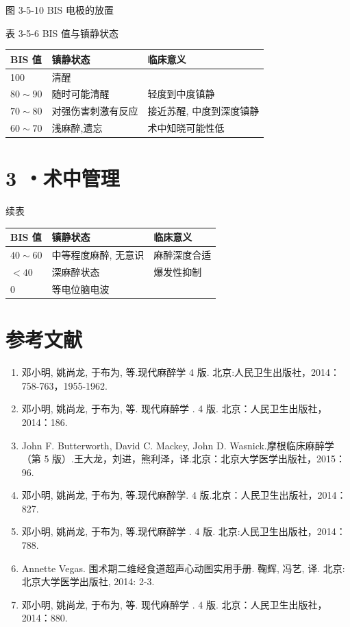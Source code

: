 \documentclass[10pt]{article}
\begin{document}
图 3-5-10 BIS 电极的放置

表 3-5-6 BIS 值与镇静状态

\begin{center}
\begin{tabular}{lll}
\hline
BIS 值 & 镇静状态 & 临床意义 \\
\hline
100 & 清醒 &  \\
$80 \sim 90$ & 随时可能清醒 & 轻度到中度镇静 \\
$70 \sim 80$ & 对强伤害刺激有反应 & 接近苏醒, 中度到深度镇静 \\
$60 \sim 70$ & 浅麻醉,遗忘 & 术中知晓可能性低 \\
\hline
\end{tabular}
\end{center}

\section*{3 ・术中管理}
续表

\begin{center}
\begin{tabular}{lll}
\hline
BIS 值 & 镇静状态 & 临床意义 \\
\hline
$40 \sim 60$ & 中等程度麻醉, 无意识 & 麻醉深度合适 \\
$<40$ & 深麻醉状态 & 爆发性抑制 \\
0 & 等电位脑电波 &  \\
\hline
\end{tabular}
\end{center}

\section*{参考文献}
\begin{enumerate}
  \item 邓小明, 姚尚龙, 于布为, 等.现代麻醉学 4 版. 北京:人民卫生出版社，2014：758-763，1955-1962.

  \item 邓小明, 姚尚龙, 于布为, 等. 现代麻醉学 . 4 版. 北京：人民卫生出版社，2014：186.

  \item John F. Butterworth, David C. Mackey, John D. Wasnick.摩根临床麻醉学（第 5 版）.王大龙，刘进，熊利泽，译.北京：北京大学医学出版社，2015：96.

  \item 邓小明, 姚尚龙, 于布为, 等.现代麻醉学. 4 版.北京：人民卫生出版社，2014：827.

  \item 邓小明, 姚尚龙, 于布为, 等.现代麻醉学 . 4 版. 北京:人民卫生出版社，2014：788.

  \item Annette Vegas. 围术期二维经食道超声心动图实用手册. 鞠辉, 冯艺, 译. 北京: 北京大学医学出版社, 2014: 2-3.

  \item 邓小明, 姚尚龙, 于布为, 等. 现代麻醉学 . 4 版. 北京：人民卫生出版社，2014：880.

\end{enumerate}
\end{document}
